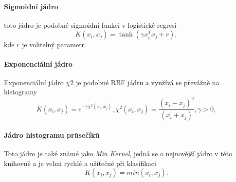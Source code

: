 \paragraph*{Sigmoidní jádro}
toto jádro je podobné sigmoidní funkci v logistické regresi
\begin{equation*}
\label{sigmK}
 K(x_i, x_j) = \tanh(\gamma x_i^T x_j + r),
\end{equation*}
kde $r$ je volitelný parametr.

\paragraph*{Exponenciální jádro}
Exponenciální jádro $\chi$2 je podobné RBF jádru a využívá se převážně na histogramy
\begin{equation*}
\label{expK}
 K(x_i, x_j) = e^{-\gamma \chi^2(x_i,x_j)}, \chi^2(x_i,x_j) = \frac{(x_i-x_j)^2}{(x_i+x_j)}, \gamma > 0,
\end{equation*}

\paragraph*{Jádro histogramu průsečíků}
Toto jádro je také známé jako \textit{Min Kernel}, jedná se o nejnovější jádro v této knihovně a je velmi rychlé a užitečné při klasifikaci
\begin{equation*}
\label{innK}
 K(x_i, x_j) = min(x_i,x_j).
\end{equation*}

